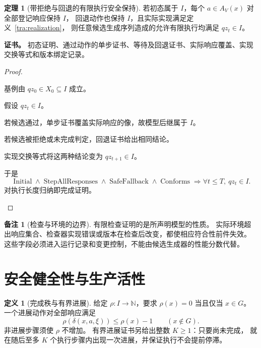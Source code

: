 \documentclass[UTF8,12pt,a4paper,openany,fontset=none,zihao=false]{ctexrep}
\theoremstyle{definition}
\newtheorem{definition}{定义}[chapter]
\newtheorem{theorem}{定理}[chapter]
\newtheorem{remark}{备注}[chapter]
\newenvironment{certificate}{\par\noindent\textbf{证书。}\ignorespaces}{\par}
\newcommand{\1}{\mathbf 1}
\begin{document}
\begin{theorem}[带拒绝与回退的有限执行安全保持]
\label{tra:safety}
若初态属于 \(I\)，每个 \(a\in A_V(x)\) 对全部登记响应保持 \(I\)，
回退动作也保持 \(I\)，且实际实现满足定义~\ref{tra:realization}，
则任意候选生成序列造成的允许有限执行均满足 \(qz_t\in I\)。
\end{theorem}
\begin{certificate}
初态证明、通过动作的单步证书、等待及回退证书、实际响应覆盖、实现交换等式和版本绑定记录。
\end{certificate}
\begin{proof}
\begin{semanticsteps}
\item 基例由 \(qz_0\in X_0\subseteq I\) 成立。
\item 假设 \(qz_t\in I\)。
\item 若候选通过，单步证书覆盖实际响应的像，故模型后继属于 \(I\)。
\item 若候选被拒绝或未完成判定，回退证书给出相同结论。
\item 实现交换等式将这两种结论变为 \(qz_{t+1}\in I\)。
\item 于是
\[
\operatorname{Initial}\land\operatorname{StepAllResponses}
\land\operatorname{SafeFallback}\land\operatorname{Conforms}
\Longrightarrow \forall t\le T,\ qz_t\in I.
\]
对执行长度归纳即完成证明。
\end{semanticsteps}
\end{proof}

\begin{remark}[检查与环境的边界]
有限检查证明的是所声明模型的性质。
实际环境超出响应集合、检查器实现错误或版本在检查后改变，都使相应符合性前件失效。
这些字段必须进入运行记录和变更控制，不能由候选生成器的性能分数代替。
\end{remark}

\section{安全健全性与生产活性}

\begin{definition}[完成秩与有界进展]
\label{tra:rank}
给定 \(\rho:I\to\mathbb N\)，要求 \(\rho(x)=0\) 当且仅当 \(x\in G\)。
一个进展动作对全部响应满足
\[
\rho(\delta(x,a,\xi))\le\rho(x)-1\qquad(x\notin G).
\]
非进展步骤须使 \(\rho\) 不增加。
有界进展证书另给出整数 \(K\ge1\)：只要尚未完成，
就在随后至多 \(K\) 个执行步骤内出现一次进展，并保证执行不会提前停滞。
\end{definition}
\end{document}
